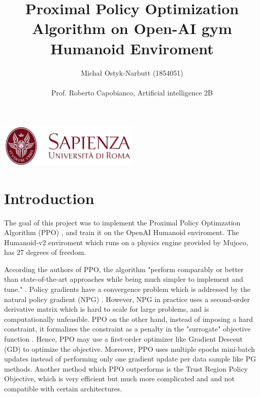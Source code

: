 \documentclass[12pt,a4paper]{article}
\begin{document}
\title{Proximal Policy Optimization Algorithm on Open-AI gym Humanoid Enviroment}
\author{Michał Ostyk-Narbutt (1854051)\\ \\ Prof. Roberto Capobianco, Artificial intelligence 2B}

\maketitle


\begin{center}
\includegraphics[width=0.5\textwidth]{img/sapienza_logo.jpg}
\end{center}
\maketitle
\tableofcontents
\clearpage
\section{Introduction}
The goal of this project was to implement the Proximal Policy Optimzation Algorithm  (PPO) \cite{PPO}, and train it on the OpenAI Humanoid enviroment. The Humanoid-v2 enviroment which runs on a physics engine provided by Mujoco, has 27 degrees of freedom. 

According the authors of PPO, the algorithm "perform comparably or better than state-of-the-art approaches while being much simpler to implement and tune." \cite{PPO}. Policy gradients have a convergence problem which is addressed  by the natural policy gradient (NPG) \cite{NPG}. However, NPG in practice uses a second-order derivative matrix which is hard to scale for large problems, and is computationally unfeasible. PPO on the other hand, instead of imposing a hard constraint, it  formalizes the constraint as a penalty in the "surrogate" objective function \cite{hui}. Hence, PPO may use a first-order optimizer like Gradient Descent (GD) to optimize the objective. Moreover, PPO uses multiple epochs mini-batch updates  instead of performing only one gradient update per data sample like PG methods. Another method which PPO outperforms is the Trust Region Policy Objective, which is very efficient but much more complicated and and not compatible with certain architectures.
\end{document}
